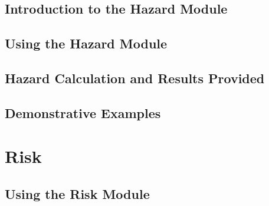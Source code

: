 \documentclass[11pt,fleqn]{book} %
\begin{document}
\chapter{Introduction to the Hazard Module}
   \label{chap:oqhazintro}
	
   
   

\chapter{Using the Hazard Module}
	\label{chap:hazinp}
	

\chapter{Hazard Calculation and Results Provided}
	\label{chap:hazout}
	

\chapter{Demonstrative Examples}
	\label{chap:hazdemo}
	

\thispagestyle{empty}
\part{Risk}

% 	

\chapter{Using the Risk Module}
	\label{chap:riskmodule}
	
\end{document}
